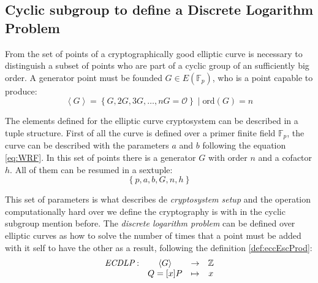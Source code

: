 \documentclass[10pt,a4paper,twoside]{llncs}
\newcommand{\Fp}{\ensuremath{\mathbb{F}_p}}%
\newcommand{\EFp}{\ensuremath{E(\mathbb{F}_p)}}%
\begin{document}
\subsection{Cyclic subgroup to define a Discrete Logarithm Problem \label{sec:ecdlp}}

From the set of points of a cryptographically good elliptic curve is necessary to distinguish a subset of points who are part of a cyclic group of an sufficiently big order. A generator point must be founded $G \in \EFp$, who is a point capable to produce:
\begin{equation}\label{eq:sgc}
\left\langle G\right\rangle = \left\{ G,2G,3G,\dots,nG=\mathcal{O}\right\} \; \vert \; \text{ord}(G) = n
\end{equation}

\begin{corollary}
The elements defined for the elliptic curve cryptosystem can be described in a tuple structure. First of all the curve is defined over a primer finite field \Fp, the curve can be described with the parameters $a$ and $b$ following the equation \ref{eq:WRF}. In this set of points there is a generator $G$ with order $n$ and a cofactor $h$. All of them can be resumed in a sextuple:
\begin{equation}\label{eq:setupla}\left\{ p,a,b,G,n,h\right\}\end{equation}
\end{corollary}

This set of parameters is what describes de \emph{cryptosystem setup} and the operation computationally hard over we define the cryptography is with in the cyclic subgroup mention before. The \emph{discrete logarithm problem} can be defined over elliptic curves as how to solve the number of times that a point must be added with it self to have the other as a result, following the definition \ref{def:eccEscProd}:
\begin{equation}\label{ECDLP}
        \begin{array}{cccc}
                \emph{ECDLP}: & \left\langle G\right\rangle & \rightarrow & \mathbb{Z} \\
                \;     & Q=[x]P                           & \mapsto     & x  \\
        \end{array}
\end{equation}
\end{document}
